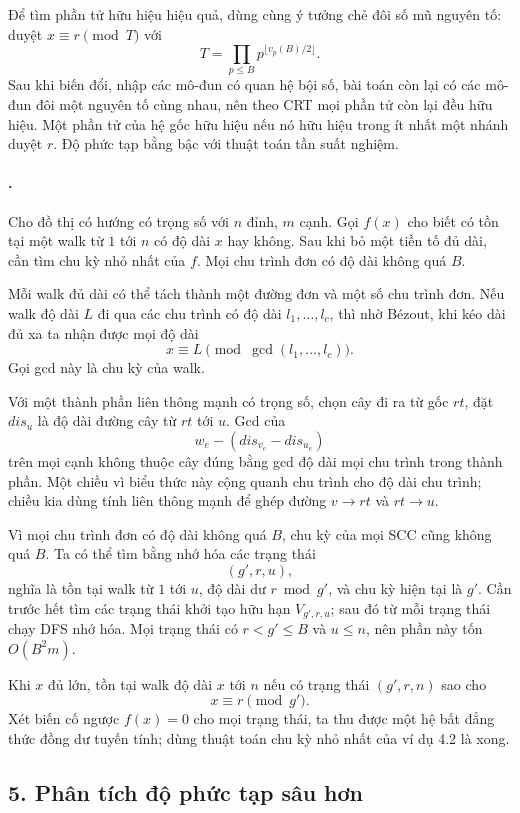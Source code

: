\documentclass[11pt]{article}
\begin{document}
Để tìm phần tử hữu hiệu hiệu quả, dùng cùng ý tưởng chẻ đôi số mũ nguyên tố:
duyệt \(x\equiv r\pmod T\) với
\[
  T=\prod_{p\le B}p^{\lfloor v_p(B)/2\rfloor}.
\]
Sau khi biến đổi, nhập các mô-đun có quan hệ bội số, bài toán còn lại có các
mô-đun đôi một nguyên tố cùng nhau, nên theo CRT mọi phần tử còn lại đều hữu
hiệu. Một phần tử của hệ gốc hữu hiệu nếu nó hữu hiệu trong ít nhất một nhánh
duyệt \(r\). Độ phức tạp bằng bậc với thuật toán tần suất nghiệm.

\paragraph{.}
Cho đồ thị có hướng có trọng số với \(n\) đỉnh, \(m\) cạnh. Gọi \(f(x)\) cho
biết có tồn tại một walk từ \(1\) tới \(n\) có độ dài \(x\) hay không. Sau khi
bỏ một tiền tố đủ dài, cần tìm chu kỳ nhỏ nhất của \(f\). Mọi chu trình đơn
có độ dài không quá \(B\).

Mỗi walk đủ dài có thể tách thành một đường đơn và một số chu trình đơn. Nếu
walk độ dài \(L\) đi qua các chu trình có độ dài \(l_1,\ldots,l_c\), thì nhờ
Bézout, khi kéo dài đủ xa ta nhận được mọi độ dài
\[
  x\equiv L\pmod{\gcd(l_1,\ldots,l_c)}.
\]
Gọi gcd này là chu kỳ của walk.

Với một thành phần liên thông mạnh có trọng số, chọn cây đi ra từ gốc \(rt\),
đặt \(dis_u\) là độ dài đường cây từ \(rt\) tới \(u\). Gcd của
\[
  w_e-(dis_{v_e}-dis_{u_e})
\]
trên mọi cạnh không thuộc cây đúng bằng gcd độ dài mọi chu trình trong thành
phần. Một chiều vì biểu thức này cộng quanh chu trình cho độ dài chu trình;
chiều kia dùng tính liên thông mạnh để ghép đường \(v\to rt\) và \(rt\to u\).

Vì mọi chu trình đơn có độ dài không quá \(B\), chu kỳ của mọi SCC cũng không
quá \(B\). Ta có thể tìm bằng nhớ hóa các trạng thái
\[
  (g',r,u),
\]
nghĩa là tồn tại walk từ \(1\) tới \(u\), độ dài dư \(r\bmod g'\), và chu kỳ
hiện tại là \(g'\). Cần trước hết tìm các trạng thái khởi tạo hữu hạn
\(V_{g',r,u}\); sau đó từ mỗi trạng thái chạy DFS nhớ hóa. Mọi trạng thái có
\(r<g'\le B\) và \(u\le n\), nên phần này tốn \(O(B^2m)\).

Khi \(x\) đủ lớn, tồn tại walk độ dài \(x\) tới \(n\) nếu có trạng thái
\((g',r,n)\) sao cho
\[
  x\equiv r\pmod {g'}.
\]
Xét biến cố ngược \(f(x)=0\) cho mọi trạng thái, ta thu được một hệ bất đẳng
thức đồng dư tuyến tính; dùng thuật toán chu kỳ nhỏ nhất của ví dụ 4.2 là xong.

\subsection*{5. Phân tích độ phức tạp sâu hơn}
\end{document}
